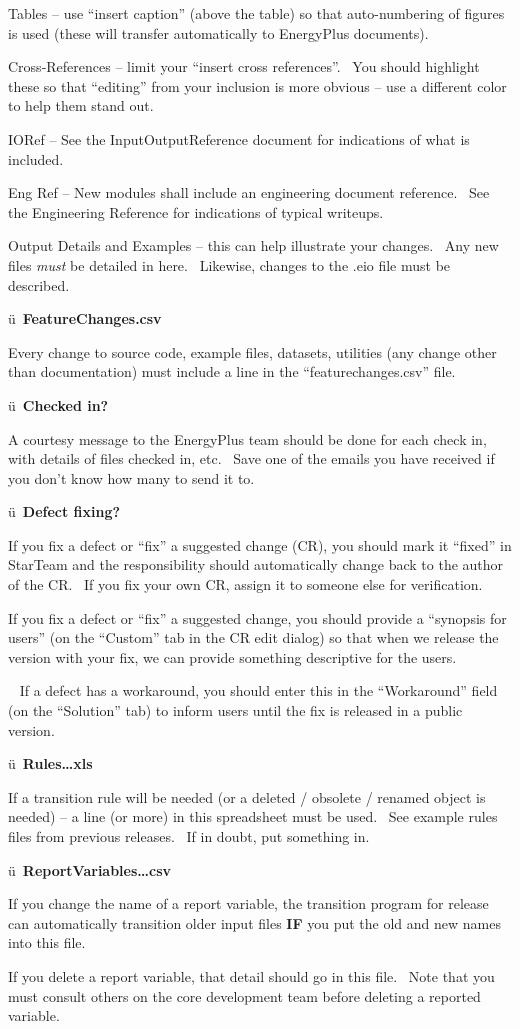 Tables -- use ``insert caption'' (above the table) so that auto-numbering of figures is used (these will transfer automatically to EnergyPlus documents).

Cross-References -- limit your ``insert cross references''.~ You should highlight these so that ``editing'' from your inclusion is more obvious -- use a different color to help them stand out.

IORef -- See the InputOutputReference document for indications of what is included.

Eng Ref -- New modules shall include an engineering document reference.~ See the Engineering Reference for indications of typical writeups.

Output Details and Examples -- this can help illustrate your changes.~ Any new files \emph{must} be detailed in here.~ Likewise, changes to the .eio file must be described.

ü~\textbf{FeatureChanges.csv}

Every change to source code, example files, datasets, utilities (any change other than documentation) must include a line in the ``featurechanges.csv'' file.

ü~\textbf{Checked in?}

A courtesy message to the EnergyPlus team should be done for each check in, with details of files checked in, etc.~ Save one of the emails you have received if you don't know how many to send it to.

ü~\textbf{Defect fixing?}

If you fix a defect or ``fix'' a suggested change (CR), you should mark it ``fixed'' in StarTeam and the responsibility should automatically change back to the author of the CR.~ If you fix your own CR, assign it to someone else for verification.

If you fix a defect or ``fix'' a suggested change, you should provide a ``synopsis for users'' (on the ``Custom'' tab in the CR edit dialog) so that when we release the version with your fix, we can provide something descriptive for the users.

~ If a defect has a workaround, you should enter this in the ``Workaround'' field (on the ``Solution'' tab) to inform users until the fix is released in a public version.

ü~\textbf{Rules\ldots{}xls}

If a transition rule will be needed (or a deleted / obsolete / renamed object is needed) -- a line (or more) in this spreadsheet must be used.~ See example rules files from previous releases.~ If in doubt, put something in.

ü~\textbf{ReportVariables\ldots{}csv}

If you change the name of a report variable, the transition program for release can automatically transition older input files \textbf{IF} you put the old and new names into this file.

If you delete a report variable, that detail should go in this file.~ Note that you must consult others on the core development team before deleting a reported variable.
